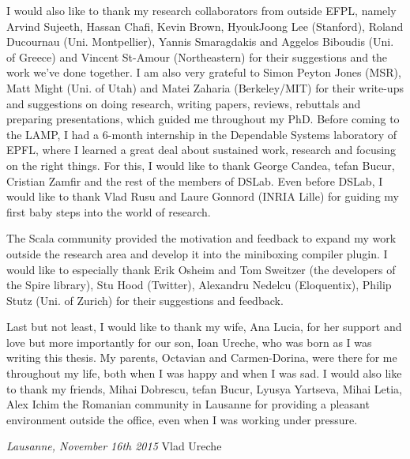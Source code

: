 I would also like to thank my research collaborators from outside EFPL, namely Arvind Sujeeth, Hassan Chafi, Kevin Brown, HyoukJoong Lee (Stanford), Roland Ducournau (Uni. Montpellier), Yannis Smaragdakis and Aggelos Biboudis (Uni. of Greece) and Vincent St-Amour (Northeastern) for their suggestions and the work we've done together. I am also very grateful to Simon Peyton Jones (MSR), Matt Might (Uni. of Utah) and Matei Zaharia (Berkeley/MIT) for their write-ups and suggestions on doing research, writing papers, reviews, rebuttals and preparing presentations, which guided me throughout my PhD. Before coming to the LAMP, I had a 6-month internship in the Dependable Systems laboratory of EPFL, where I learned a great deal about sustained work, research and focusing on the right things. For this, I would like to thank George Candea, tefan Bucur, Cristian Zamfir and the rest of the members of DSLab. Even before DSLab, I would like to thank Vlad Rusu and Laure Gonnord (INRIA Lille) for guiding my first baby steps into the world of research.

\vspace{0.5em}

The Scala community provided the motivation and feedback to expand my work outside the research area and develop it into the miniboxing compiler plugin. I would like to especially thank Erik Osheim and Tom Sweitzer (the developers of the Spire library), Stu Hood (Twitter), Alexandru Nedelcu (Eloquentix), Philip Stutz (Uni. of Zurich) for their suggestions and feedback.

\vspace{0.5em}

Last but not least, I would like to thank my wife, Ana Lucia, for her support and love but more importantly for our son, Ioan Ureche, who was born as I was writing this thesis. My parents, Octavian and Carmen-Dorina, were there for me throughout my life, both when I was happy and when I was sad. I would also like to thank my friends, Mihai Dobrescu, tefan Bucur, Lyusya Yartseva, Mihai Letia, Alex Ichim the Romanian community in Lausanne for providing a pleasant environment outside the office, even when I was working under pressure.

\bigskip

\noindent\textit{Lausanne, November 16th 2015}
\hfill Vlad Ureche
